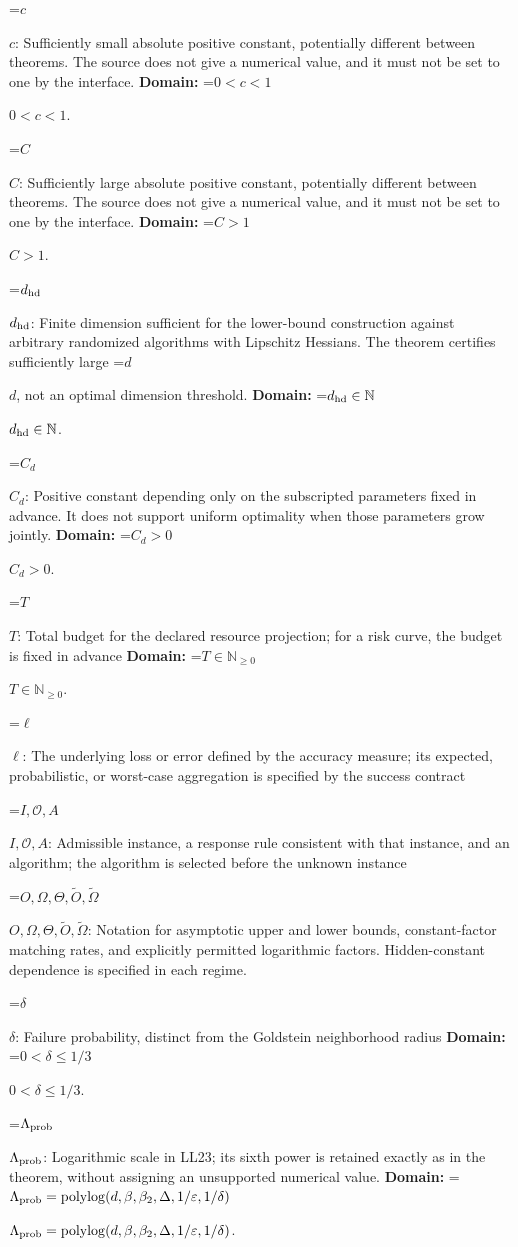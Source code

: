 \documentclass[10pt,a4paper]{article}
\newcommand{\AtlasMath}[1]{\par\begingroup\centering\setbox0=\hbox{$\displaystyle #1$}\ifdim\wd0>1.4\linewidth\typeout{ATLAS WIDE FORMULA: \the\wd0}\fi\ifdim\wd0>\linewidth\resizebox{\linewidth}{!}{\box0}\else\box0\fi\par\endgroup}
\newcommand{\AtlasInlineMath}[1]{\begingroup\setbox0=\hbox{$#1$}\ifdim\wd0>.4\linewidth\endgroup\AtlasMath{#1}\else\endgroup$#1$\fi}
\begin{document}
\AtlasInlineMath{c}: Sufficiently small absolute positive constant, potentially different between theorems. The source does not give a numerical value, and it must not be set to one by the interface. \textbf{Domain:} \AtlasInlineMath{0<c<1}.

\AtlasInlineMath{C}: Sufficiently large absolute positive constant, potentially different between theorems. The source does not give a numerical value, and it must not be set to one by the interface. \textbf{Domain:} \AtlasInlineMath{C>1}.

\AtlasInlineMath{d_{\rm hd}}: Finite dimension sufficient for the lower-bound construction against arbitrary randomized algorithms with Lipschitz Hessians. The theorem certifies sufficiently large \AtlasInlineMath{d}, not an optimal dimension threshold. \textbf{Domain:} \AtlasInlineMath{d_{\rm hd}\in\mathbb{N}}.

\AtlasInlineMath{C_d}: Positive constant depending only on the subscripted parameters fixed in advance. It does not support uniform optimality when those parameters grow jointly. \textbf{Domain:} \AtlasInlineMath{C_d>0}.

\AtlasInlineMath{T}: Total budget for the declared resource projection; for a risk curve, the budget is fixed in advance \textbf{Domain:} \AtlasInlineMath{T\in\mathbb{N}_{\ge0}}.

\AtlasInlineMath{\ell}: The underlying loss or error defined by the accuracy measure; its expected, probabilistic, or worst-case aggregation is specified by the success contract

\AtlasInlineMath{I,\mathcal{O},A}: Admissible instance, a response rule consistent with that instance, and an algorithm; the algorithm is selected before the unknown instance

\AtlasInlineMath{O,\Omega,\Theta,\widetilde{O},\widetilde\Omega}: Notation for asymptotic upper and lower bounds, constant-factor matching rates, and explicitly permitted logarithmic factors. Hidden-constant dependence is specified in each regime.

\AtlasInlineMath{\delta}: Failure probability, distinct from the Goldstein neighborhood radius \textbf{Domain:} \AtlasInlineMath{0<\delta\le1/3}.

\AtlasInlineMath{\Lambda_{\rm prob}}: Logarithmic scale in LL23; its sixth power is retained exactly as in the theorem, without assigning an unsupported numerical value. \textbf{Domain:} \AtlasInlineMath{\Lambda_{\rm prob}=\operatorname{polylog}(d,\beta,\beta_2,\Delta,1/\varepsilon,1/\delta)}.
\end{document}
